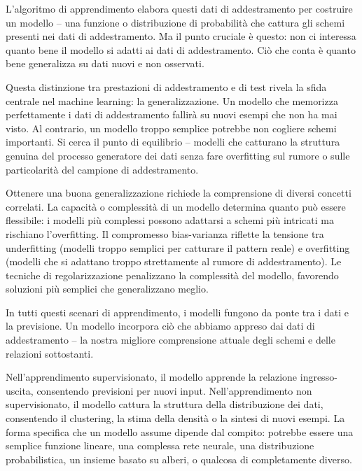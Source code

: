 L'algoritmo di apprendimento elabora questi dati di addestramento per costruire un modello -- una funzione o distribuzione di probabilità che cattura gli schemi presenti nei dati di addestramento. Ma il punto cruciale è questo: non ci interessa quanto bene il modello si adatti ai dati di addestramento. Ciò che conta è quanto bene generalizza su dati nuovi e non osservati.

Questa distinzione tra prestazioni di addestramento e di test rivela la sfida centrale nel machine learning: la \alert{generalizzazione}. Un modello che memorizza perfettamente i dati di addestramento fallirà su nuovi esempi che non ha mai visto. Al contrario, un modello troppo semplice potrebbe non cogliere schemi importanti. Si cerca il punto di equilibrio -- modelli che catturano la struttura genuina del processo generatore dei dati senza fare overfitting sul rumore o sulle particolarità del campione di addestramento.

Ottenere una buona generalizzazione richiede la comprensione di diversi concetti correlati. La \alert{capacità} o \alert{complessità} di un modello determina quanto può essere flessibile: i modelli più complessi possono adattarsi a schemi più intricati ma rischiano l'overfitting. Il \alert{compromesso bias-varianza} riflette la tensione tra underfitting (modelli troppo semplici per catturare il pattern reale) e overfitting (modelli che si adattano troppo strettamente al rumore di addestramento). Le tecniche di \alert{regolarizzazione} penalizzano la complessità del modello, favorendo soluzioni più semplici che generalizzano meglio.
\medskip


In tutti questi scenari di apprendimento, i modelli fungono da ponte tra i dati e la previsione. Un modello incorpora ciò che abbiamo appreso dai dati di addestramento -- la nostra migliore comprensione attuale degli schemi e delle relazioni sottostanti.

Nell'apprendimento supervisionato, il modello apprende la relazione ingresso-uscita, consentendo previsioni per nuovi input. Nell'apprendimento non supervisionato, il modello cattura la struttura della distribuzione dei dati, consentendo il clustering, la stima della densità o la sintesi di nuovi esempi. La forma specifica che un modello assume dipende dal compito: potrebbe essere una semplice funzione lineare, una complessa rete neurale, una distribuzione probabilistica, un insieme basato su alberi, o qualcosa di completamente diverso.

